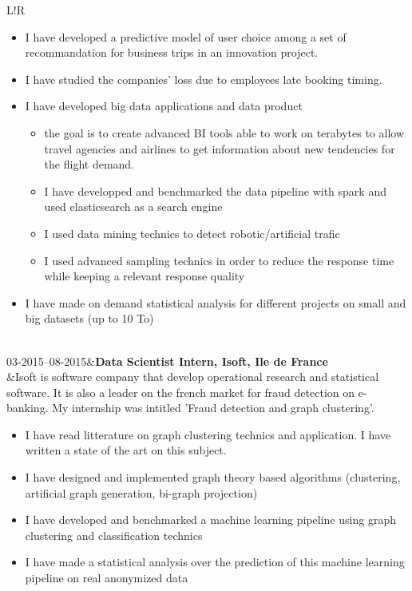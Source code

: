 \documentclass[6pt]{article}
\newcommand\VRule{\color{lightgray}\vrule width 0.5pt}
\begin{document}
\begin{tabular}{L!{\VRule}R}
\begin{itemize}
	\item I have developed a predictive model of user choice among a set of recommandation for business trips in an innovation project.
	\item I have studied the companies' loss due to employees late booking timing.
	\item I have developed big data applications and data product
		\begin{itemize}
			\item the goal is to create advanced BI tools able to work on terabytes to allow travel agencies and airlines to get information about new tendencies for the flight demand.
			\item I have developped and benchmarked the data pipeline with spark and used elasticsearch as a search engine
			\item I used data mining technics to detect robotic/artificial trafic
			\item I used advanced sampling technics in order to reduce the response time while keeping a relevant response quality
		\end{itemize}
	\item I have made on demand statistical analysis for different projects on small and big datasets (up to 10 To)
\end{itemize}

\\[5pt]
03-2015--08-2015&\textbf{Data Scientist Intern, Isoft, Ile de France}\\
&Isoft is software company that develop operational research and statistical software. It is also a leader on the french market for fraud detection on e-banking. My internship was intitled 'Fraud detection and graph clustering'. 
\begin{itemize}
	\item I have read litterature on graph clustering technics and application. I have written a state of the art on this subject.
	\item I have designed and implemented graph theory based algorithms (clustering, artificial graph generation, bi-graph projection)
	\item I have developed and benchmarked a machine learning pipeline using graph clustering and classification technics
	\item I have made a statistical analysis over the prediction of this machine learning pipeline on real anonymized data
\end{itemize}
\end{tabular}
\end{document}
